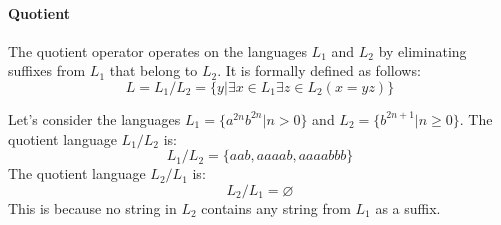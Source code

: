 \paragraph*{Quotient} 
The quotient operator operates on the languages $L_1$ and $L_2$ by eliminating suffixes from $L_1$ that belong to $L_2$. 
It is formally defined as follows:
\[L=L_1/L_2=\{y|\exists x \in L_1 \exists z \in L_2 (x=yz)\}\]
\begin{example}
    Let's consider the languages $L_1=\{a^{2n}b^{2n}|n>0\}$ and $L_2=\{b^{2n+1}|n \geq 0\}$. 
    The quotient language $L_1/L_2$ is:
    \[L_1/L_2=\{aab,aaaab,aaaabbb\}\]
    The quotient language $L_2/L_1$ is:
    \[L_2/L_1=\varnothing\]
    This is because no string in $L_2$ contains any string from $L_1$ as a suffix.
\end{example}